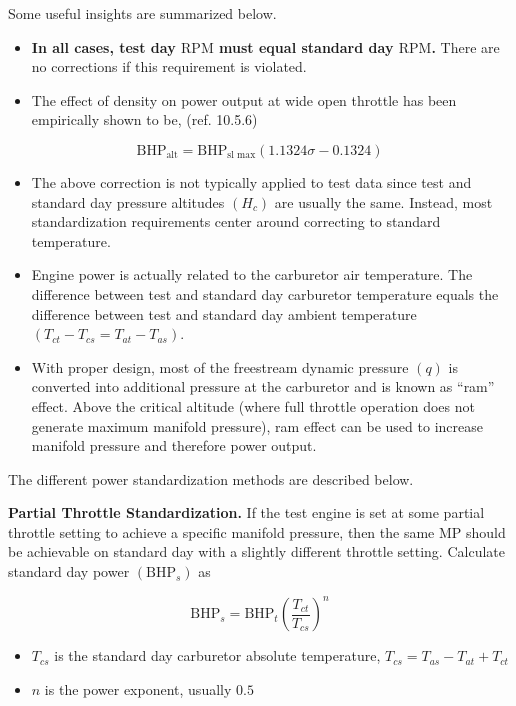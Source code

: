 \documentclass[
]{book}
\providecommand{\tightlist}{%
  \setlength{\itemsep}{0pt}\setlength{\parskip}{0pt}}
\begin{document}
Some useful insights are summarized below.

\begin{itemize}
\tightlist
\item
  \textbf{In all cases, test day \(\mathrm{RPM}\) must equal standard day \(\mathrm{RPM}\).} There are no corrections if this requirement is violated.
\item
  The effect of density on power output at wide open throttle has been empirically shown to be, (ref. 10.5.6)
\end{itemize}

\[
\mathrm{BHP}_{\text{alt}} = \mathrm{BHP}_{\text{sl max}} \left( 1.1324 \sigma - 0.1324 \right)
\]

\begin{itemize}
\tightlist
\item
  The above correction is not typically applied to test data since test and standard day pressure altitudes \(\left( H_c \right)\) are usually the same. Instead, most standardization requirements center around correcting to standard temperature.
\item
  Engine power is actually related to the carburetor air temperature. The difference between test and standard day carburetor temperature equals the difference between test and standard day ambient temperature \(\left( T_{ct} - T_{cs} = T_{at} - T_{as} \right)\).
\item
  With proper design, most of the freestream dynamic pressure \(\left( q \right)\) is converted into additional pressure at the carburetor and is known as ``ram'' effect. Above the critical altitude (where full throttle operation does not generate maximum manifold pressure), ram effect can be used to increase manifold pressure and therefore power output.
\end{itemize}

The different power standardization methods are described below.

\textbf{Partial Throttle Standardization.} If the test engine is set at some partial throttle setting to achieve a specific manifold pressure, then the same \(\mathrm{MP}\) should be achievable on standard day with a slightly different throttle setting. Calculate standard day power \(\left( \mathrm{BHP}_s \right)\) as

\[
\mathrm{BHP}_s = \mathrm{BHP}_t \left( \frac{T_{ct}}{T_{cs}} \right)^n
\]

\begin{itemize}
\tightlist
\item
  \(T_{cs}\) is the standard day carburetor absolute temperature, \(T_{cs} = T_{as} - T_{at} + T_{ct}\)
\item
  \(n\) is the power exponent, usually \(0.5\)
\end{itemize}
\end{document}
